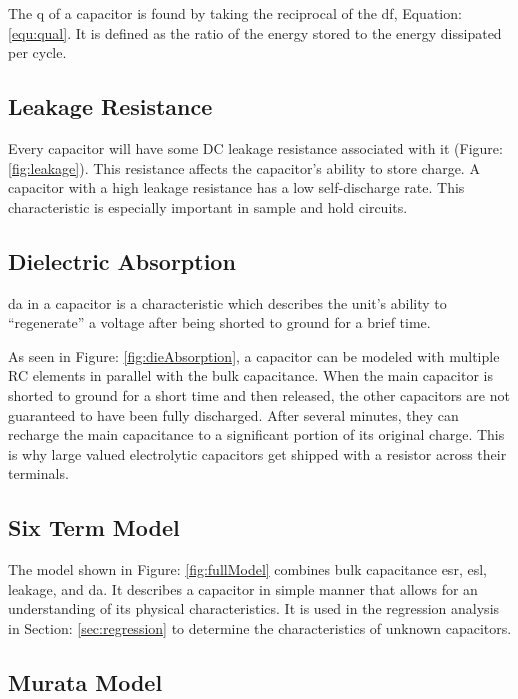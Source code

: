 
The \gls{q} of a capacitor is found by taking the reciprocal of the \acrlong{df}, Equation: \eqref{equ:qual}. It is defined as the ratio of the energy stored to the energy dissipated per cycle.

\subsection{Leakage Resistance}


Every capacitor will have some DC leakage resistance associated with it (Figure:\ref{fig:leakage}). This resistance affects the capacitor's ability to store charge. A capacitor with a high leakage resistance has a low self-discharge rate. This characteristic is especially important in sample and hold circuits.


\subsection{Dielectric Absorption}


\gls{da} in a capacitor is a characteristic which describes the unit's ability to ``regenerate'' a voltage after being shorted to ground for a brief time.

As seen in Figure: \ref{fig:dieAbsorption}, a capacitor can be modeled with multiple RC elements in parallel with the bulk capacitance. When the main capacitor is shorted to ground for a short time and then released, the other capacitors are not guaranteed to have been fully discharged. After several minutes, they can recharge the main capacitance to a significant portion of its original charge. This is why large valued electrolytic capacitors get shipped with a resistor across their terminals.

\subsection{Six Term Model}


The model shown in Figure: \ref{fig:fullModel} combines bulk capacitance \gls{esr}, \gls{esl}, leakage, and \gls{da}. It describes a capacitor in simple manner that allows for an understanding of its physical characteristics. It is used in the regression analysis in Section: \ref{sec:regression} to determine the characteristics of unknown capacitors.

\subsection{Murata Model}


